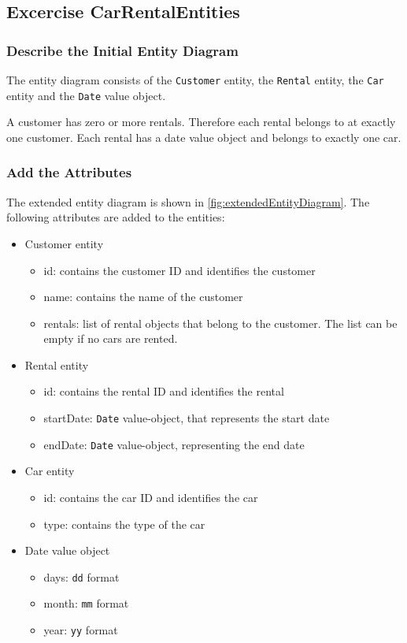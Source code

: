 \label{cha:design_of_data_and_functionality}

\subsection{Excercise CarRentalEntities}
\label{sec:exercise_car_rental_entities}
\subsubsection*{Describe the Initial Entity Diagram}
The entity diagram consists of the \texttt{Customer} entity, the \texttt{Rental} entity, the \texttt{Car} entity and the \texttt{Date} value object.

A customer has zero or more rentals.
Therefore each rental belongs to at exactly one customer.
Each rental has a date value object and belongs to exactly one car.

\subsubsection*{Add the Attributes}
The extended entity diagram is shown in \autoref{fig:extendedEntityDiagram}.
The following attributes are added to the entities:
\begin{itemize}
    \item Customer entity
    \begin{itemize}
        \item id: contains the customer ID and identifies the customer
        \item name: contains the name of the customer
        \item rentals: list of rental objects that belong to the customer. The list can be empty if no cars are rented.
    \end{itemize}
    \item Rental entity
    \begin{itemize}
        \item id: contains the rental ID and identifies the rental
        \item startDate: \texttt{Date} value-object, that represents the start date
        \item endDate: \texttt{Date} value-object, representing the end date
    \end{itemize}
    \item Car entity
    \begin{itemize}
        \item id: contains the car ID and identifies the car
        \item type: contains the type of the car
    \end{itemize}
    \item Date value object
    \begin{itemize}
        \item days: \texttt{dd} format
        \item month: \texttt{mm} format
        \item year: \texttt{yy} format
    \end{itemize}
\end{itemize}

